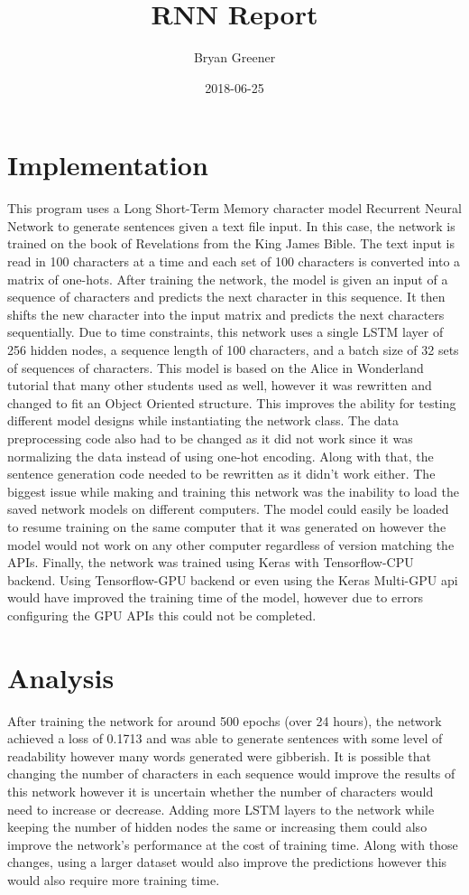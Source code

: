 \documentclass{article}
\title{RNN Report}
\author{Bryan Greener}
\date{2018-06-25}
\theoremstyle{plain} %
\theoremstyle{definition} %
\theoremstyle{plain} %
\begin{document}
\maketitle

\section*{Implementation}
This program uses a Long Short-Term Memory character model Recurrent Neural Network to generate sentences given a text file input. In this case, the network is trained on the book of Revelations from the King James Bible. The text input is read in 100 characters at a time and each set of 100 characters is converted into a matrix of one-hots. After training the network, the model is given an input of a sequence of characters and predicts the next character in this sequence. It then shifts the new character into the input matrix and predicts the next characters sequentially. Due to time constraints, this network uses a single LSTM layer of 256 hidden nodes, a sequence length of 100 characters, and a batch size of 32 sets of sequences of characters. This model is based on the Alice in Wonderland tutorial that many other students used as well, however it was rewritten and changed to fit an Object Oriented structure. This improves the ability for testing different model designs while instantiating the network class. The data preprocessing code also had to be changed as it did not work since it was normalizing the data instead of using one-hot encoding. Along with that, the sentence generation code needed to be rewritten as it didn't work either. The biggest issue while making and training this network was the inability to load the saved network models on different computers. The model could easily be loaded to resume training on the same computer that it was generated on however the model would not work on any other computer regardless of version matching the APIs. Finally, the network was trained using Keras with Tensorflow-CPU backend. Using Tensorflow-GPU backend or even using the Keras Multi-GPU api would have improved the training time of the model, however due to errors configuring the GPU APIs this could not be completed. 

\section*{Analysis}
After training the network for around 500 epochs (over 24 hours), the network achieved a loss of 0.1713 and was able to generate sentences with some level of readability however many words generated were gibberish. It is possible that changing the number of characters in each sequence would improve the results of this network however it is uncertain whether the number of characters would need to increase or decrease. Adding more LSTM layers to the network while keeping the number of hidden nodes the same or increasing them could also improve the network's performance at the cost of training time. Along with those changes, using a larger dataset would also improve the predictions however this would also require more training time.
\end{document}
